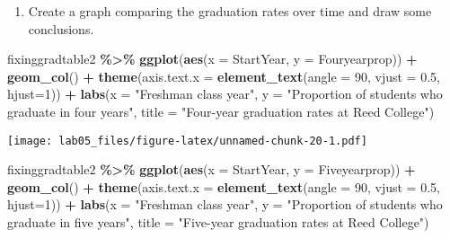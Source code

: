 \documentclass[
]{article}
\newenvironment{Shaded}{\begin{snugshade}}{\end{snugshade}}
\newcommand{\AttributeTok}[1]{\textcolor[rgb]{0.13,0.29,0.53}{#1}}
\newcommand{\DecValTok}[1]{\textcolor[rgb]{0.00,0.00,0.81}{#1}}
\newcommand{\FloatTok}[1]{\textcolor[rgb]{0.00,0.00,0.81}{#1}}
\newcommand{\FunctionTok}[1]{\textcolor[rgb]{0.13,0.29,0.53}{\textbf{#1}}}
\newcommand{\NormalTok}[1]{#1}
\newcommand{\SpecialCharTok}[1]{\textcolor[rgb]{0.81,0.36,0.00}{\textbf{#1}}}
\newcommand{\StringTok}[1]{\textcolor[rgb]{0.31,0.60,0.02}{#1}}
\providecommand{\tightlist}{%
  \setlength{\itemsep}{0pt}\setlength{\parskip}{0pt}}
\begin{document}
\begin{enumerate}
\def\labelenumi{\alph{enumi}.}
\setcounter{enumi}{5}
\tightlist
\item
  Create a graph comparing the graduation rates over time and draw some
  conclusions.
\end{enumerate}

\begin{Shaded}
\begin{Highlighting}[]
\NormalTok{fixinggradtable2 }\SpecialCharTok{\%\textgreater{}\%}
  \FunctionTok{ggplot}\NormalTok{(}\FunctionTok{aes}\NormalTok{(}\AttributeTok{x =}\NormalTok{ StartYear, }\AttributeTok{y =}\NormalTok{ Fouryearprop)) }\SpecialCharTok{+}
  \FunctionTok{geom\_col}\NormalTok{() }\SpecialCharTok{+}
  \FunctionTok{theme}\NormalTok{(}\AttributeTok{axis.text.x =} \FunctionTok{element\_text}\NormalTok{(}\AttributeTok{angle =} \DecValTok{90}\NormalTok{, }\AttributeTok{vjust =} \FloatTok{0.5}\NormalTok{, }\AttributeTok{hjust=}\DecValTok{1}\NormalTok{)) }\SpecialCharTok{+}
  \FunctionTok{labs}\NormalTok{(}\AttributeTok{x =} \StringTok{"Freshman class year"}\NormalTok{, }\AttributeTok{y =} \StringTok{"Proportion of students who graduate in four years"}\NormalTok{, }\AttributeTok{title =} \StringTok{"Four{-}year graduation rates at Reed College"}\NormalTok{) }
\end{Highlighting}
\end{Shaded}

\texttt{[image: lab05\_files/figure-latex/unnamed-chunk-20-1.pdf]}

\begin{Shaded}
\begin{Highlighting}[]
\NormalTok{fixinggradtable2 }\SpecialCharTok{\%\textgreater{}\%}
  \FunctionTok{ggplot}\NormalTok{(}\FunctionTok{aes}\NormalTok{(}\AttributeTok{x =}\NormalTok{ StartYear, }\AttributeTok{y =}\NormalTok{ Fiveyearprop)) }\SpecialCharTok{+}
  \FunctionTok{geom\_col}\NormalTok{() }\SpecialCharTok{+}
  \FunctionTok{theme}\NormalTok{(}\AttributeTok{axis.text.x =} \FunctionTok{element\_text}\NormalTok{(}\AttributeTok{angle =} \DecValTok{90}\NormalTok{, }\AttributeTok{vjust =} \FloatTok{0.5}\NormalTok{, }\AttributeTok{hjust=}\DecValTok{1}\NormalTok{)) }\SpecialCharTok{+}
  \FunctionTok{labs}\NormalTok{(}\AttributeTok{x =} \StringTok{"Freshman class year"}\NormalTok{, }\AttributeTok{y =} \StringTok{"Proportion of students who graduate in five years"}\NormalTok{, }\AttributeTok{title =} \StringTok{"Five{-}year graduation rates at Reed College"}\NormalTok{) }
\end{Highlighting}
\end{Shaded}
\end{document}
